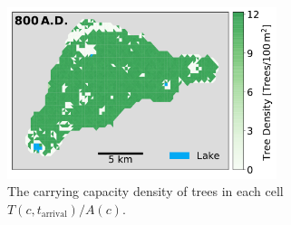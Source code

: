 \begin{figure}
	\centering
	\includegraphics[width=0.7\textwidth]{images/map_carrCap.pdf}
	\caption{The carrying capacity density of trees in each cell $T(c,t_\text{arrival})/A(c)$.}
	\label{fig:Map_tree}
\end{figure}

